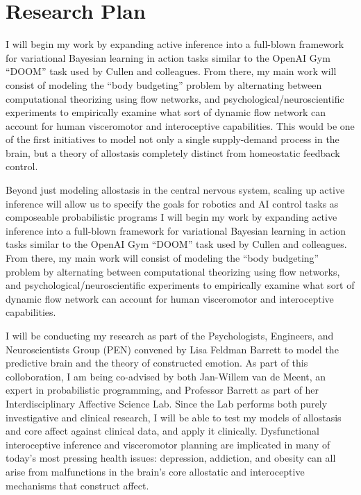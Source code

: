 
\section*{Research Plan}
\begin{singlespace}
\im
I will begin my work by expanding active inference into a full-blown framework
for variational Bayesian learning in action tasks similar to the OpenAI
Gym ``DOOM'' task used by Cullen and colleagues\cite{Cullen2018}.  From
there, my main work will consist of modeling the ``body budgeting'' problem
by alternating between computational theorizing using flow networks, and
psychological/neuroscientific experiments to empirically examine what sort
of dynamic flow network can account for human visceromotor and interoceptive
capabilities.  This would be one of the first initiatives to model not only
a single supply-demand process in the brain, but a theory of allostasis
completely distinct from homeostatic feedback control\cite{Sterling2012,Sterling2015,Christie2015}.
\end{singlespace}

\begin{singlespace}
\im
Beyond just modeling allostasis in the central nervous system, scaling
up active inference will allow us to specify the goals for robotics and AI
control tasks as composeable probabilistic programs
I will begin my work by expanding active inference into a full-blown framework
for variational Bayesian learning in action tasks similar to the OpenAI
Gym ``DOOM'' task used by Cullen and colleagues\cite{Cullen2018}.  From
there, my main work will consist of modeling the ``body budgeting'' problem
by alternating between computational theorizing using flow networks, and
psychological/neuroscientific experiments to empirically examine what sort
of dynamic flow network can account for human visceromotor and interoceptive
capabilities.
\end{singlespace}

\begin{singlespace}
\im\bi
I will be conducting my research as part of the Psychologists, Engineers,
and Neuroscientists Group (PEN) convened by Lisa Feldman Barrett to model
the predictive brain and the theory of constructed emotion\cite{Barrett2015,BarrettTheoryOfConstructed2017}.
As part of this colloboration, I am being co-advised by both Jan-Willem van
de Meent, an expert in probabilistic programming, and Professor Barrett as
part of her Interdisciplinary Affective Science Lab.  Since the Lab performs
both purely investigative and clinical research, I will be able to test my
models of allostasis and core affect against clinical data, and apply it
clinically.  Dysfunctional interoceptive inference and visceromotor planning
are implicated in many of today's most pressing health issues: depression,
addiction, and obesity can all arise from malfunctions in the brain's core
allostatic and interoceptive mechanisms that construct affect\cite{Stephan2016}.
\end{singlespace}
